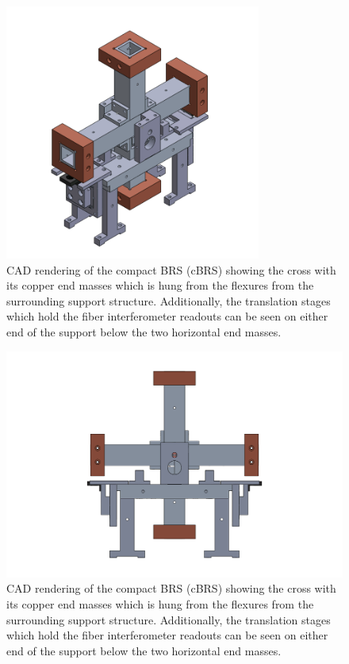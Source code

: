 \documentclass [12pt, proquest]{uwthesis}[2019]
\begin{document}
\begin{figure}[!h]
\begin{center}
\includegraphics[width=0.75\textwidth]{cBRSIso.png}
\end{center}
\caption{CAD rendering of the compact BRS (cBRS) showing the cross with its copper end masses which is hung from the flexures from the surrounding support structure. Additionally, the translation stages which hold the fiber interferometer readouts can be seen on either end of the support below the two horizontal end masses.}
\end{figure}


\begin{figure}[!h]
\begin{center}
 \includegraphics[width=\textwidth]{cBRSFront.png}
 
\caption{CAD rendering of the compact BRS (cBRS) showing the cross with its copper end masses which is hung from the flexures from the surrounding support structure. Additionally, the translation stages which hold the fiber interferometer readouts can be seen on either end of the support below the two horizontal end masses.}
\label{cBRS}
\end{center}
\end{figure}
\end{document}
